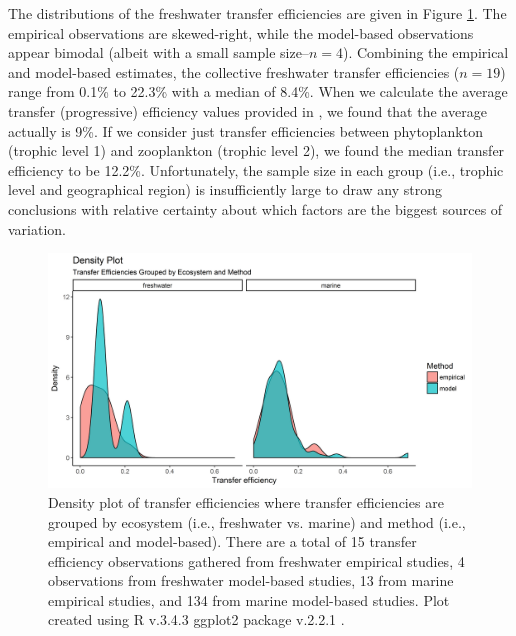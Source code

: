 \documentclass[oneside,12pt,final]{sty/ucthesis-CA2012}
\let\cite\citep                             %
\begin{document}
\begin{mainmatter}
\vspace{5mm}

The distributions of the freshwater transfer efficiencies are given in Figure \ref{dens_te}. The empirical observations are skewed-right, while the model-based observations appear bimodal (albeit with a small sample size--$n=4$). Combining the empirical and model-based estimates, the collective freshwater transfer efficiencies ($n=19$) range from 0.1\% to 22.3\% with a median of 8.4\%. When we calculate the average transfer (progressive) efficiency values provided in \citet{lindeman1942trophic}, we found that the average actually is 9\%. If we consider just transfer efficiencies between phytoplankton (trophic level 1) and zooplankton (trophic level 2), we found the median transfer efficiency to be 12.2\%. Unfortunately, the sample size in each group (i.e., trophic level and geographical region) is insufficiently large to draw any strong conclusions with relative certainty about which factors are the biggest sources of variation.

\begin{figure}[H]
     \centering
       \includegraphics[width=\textwidth]{fig/density_eco_method}
    \caption{Density plot of transfer efficiencies where transfer efficiencies are grouped by ecosystem (i.e., freshwater vs. marine) and method (i.e., empirical and model-based).  There are a total of 15 transfer efficiency observations gathered from freshwater empirical studies, 4 observations from freshwater model-based studies, 13 from marine empirical studies, and 134 from marine model-based studies. Plot created using R v.3.4.3 \cite{Rcite} ggplot2 package v.2.2.1 \cite{ggplot}. }
    \label{dens_te}
\end{figure}


\end{mainmatter}
\end{document}
